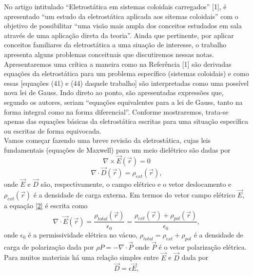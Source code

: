 \documentclass[brazilian,10.7pt,a4paper]{article}
\begin{document}
\begin{multicols}{2}
No artigo intitulado “Eletrostática em sistemas coloidais carregados” [1], é apresentado “um estudo da eletrostática aplicada aos sitemas coloidais” com o objetivo de possibilitar “uma visão mais ampla dos conceitos estudados em sala através de uma aplicação direta da teoria”. Ainda que pertinente, por aplicar conceitos familiares da eletrostática a uma siuação de interesse, o trabalho apresenta alguns problemas conceituais que discutiremos nessas notas. Apresentaremos uma crítica a maneira como na Referência [1] são derivadas equações
da eletrostática para um problema específico (sistemas coloidais) e como essas [equações (41) e (44) daquele trabalho] são interpretadas como uma possível nova lei de Gauss. Indo direto ao ponto, são apresentadas expressões que, segundo os autores, seriam “equações equivalentes para a lei de Gauss, tanto na forma integral como na forma diferencial”. Conforme mostraremos, trata-se apenas das equações básicas da eletrostática escritas para uma situação específica ou escritas de forma equivocada.\\
Vamos começar fazendo uma breve revisão da eletrostática, cujas leis fundamentais (equações de Maxwell)
para um meio dielétrico são dadas por
\begin{equation}\label{1}
\nabla\times\vec{E}(\vec{r}) = 0
\end{equation}
\vspace{5.25pt}
\begin{equation}\label{2}
\nabla\cdot\vec{D}(\vec{r}) = \rho_{ext}(\vec{r}) , 
\end{equation}
onde $\vec{E}$ e $\vec{D}$ são, respectivamente, o campo elétrico e o vetor deslocamento e $\rho_{ext}(\vec{r})$ é a densidade de carga externa. Em termos do vetor campo elétrico $\vec{E}$, a equação \eqref{2} é escrita como 
\begin{equation}\label{3}
\nabla\cdot\vec{E}(\vec{r})=\frac{\rho_{total}(\vec{r})}{\epsilon_{0}}=\frac{\rho_{ext}(\vec{r})+\rho_{pol}(\vec{r})}{\epsilon_{0}} ,
\end{equation}
onde $\epsilon_{0}$ é a permissividade elétrica no vácuo, $\rho_{total} = \rho_{ext} + \rho_{pol}$ é a densidade de carga de
polarização dada por $\rho P = -\nabla\cdot\vec{P}$ onde $\vec{P}$ é o vetor polarização elétrica. Para muitos materiais há uma
relação simples entre $\vec{E}$ e $\vec{D}$ dada por
\begin{equation}\label{4}
\vec{D} = \epsilon\vec{E} ,
\end{equation}

\end{multicols}
\end{document}
